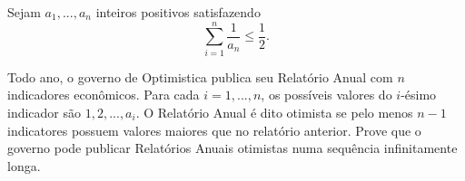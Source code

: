 Sejam $a_1, . . . , a_n$ inteiros positivos satisfazendo \[\sum_{i=1}^{n}\frac{1}{a_n}\le \frac{1}{2}.\]

Todo ano, o governo de Optimistica publica seu Relatório Anual com $n$ indicadores econômicos. Para cada $i = 1, . . . , n$, os possíveis valores do $i$-ésimo indicador são $1, 2, . . . , a_i$.
O Relatório Anual é dito otimista se pelo menos $n - 1$ indicatores possuem valores maiores que no relatório anterior.
Prove que o governo pode publicar Relatórios Anuais otimistas numa sequência infinitamente longa.
